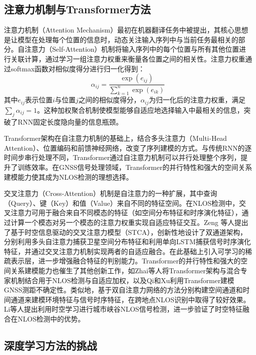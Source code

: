 \subsection{注意力机制与Transformer方法}

    注意力机制（Attention Mechanism）最初在机器翻译任务中被提出，其核心思想是让模型在处理每个位置的信息时，动态关注输入序列中与当前任务最相关的部分。自注意力（Self-Attention）机制将输入序列中的每个位置与所有其他位置进行关联计算，通过学习一组注意力权重来衡量各位置之间的相关性。注意力权重通过softmax函数对相似度得分进行归一化得到：
    \begin{equation}
    \alpha_{ij} = \frac{\exp(e_{ij})}{\sum_{k=1}^{n}\exp(e_{ik})}
    \end{equation}
    其中$e_{ij}$表示位置$i$与位置$j$之间的相似度得分，$\alpha_{ij}$为归一化后的注意力权重，满足$\sum_j \alpha_{ij} = 1$。这种加权聚合机制使模型能够自适应地选择输入中最相关的信息，突破了RNN固定长度隐向量的信息瓶颈。

    Transformer架构在自注意力机制的基础上，结合多头注意力（Multi-Head Attention）、位置编码和前馈神经网络，改变了序列建模的方式。与传统RNN的逐时间步串行处理不同，Transformer通过自注意力机制可以并行处理整个序列，提升了训练效率。在GNSS信号处理领域，Transformer的并行特性和强大的空间关系建模能力使其成为NLOS检测的理想选择。

    交叉注意力（Cross-Attention）机制是自注意力的一种扩展，其中查询（Query）、键（Key）和值（Value）来自不同的特征空间。在NLOS检测中，交叉注意力可用于融合来自不同模态的特征（如空间分布特征和时序演化特征），通过计算一个模态对另一个模态的注意力权重实现自适应特征交互。Zeng 等人\cite{zeng2024spatiotemporal}提出了基于时空信息驱动的交叉注意力模型（STCA），创新性地设计了双通道架构，分别利用多头自注意力捕获卫星空间分布特征和利用单向LSTM捕获信号时序演化特征，并通过交叉注意力机制实现两者的自适应融合。在此基础上引入可学习的稀疏表示层，进一步增强融合特征的判别能力。Transformer的并行特性和强大的空间关系建模能力也催生了其他创新工作，如Zhai等人\cite{zhai2025enhancing}将Transformer架构与混合专家机制结合用于NLOS检测与自适应加权，以及Qi和Xu\cite{applied_soft2025}利用Transformer建模GNSS测距不确定性。类似地，基于双自注意力网络的方法\cite{dual_self_attention2025}分别构建空间通道和时间通道来建模环境特征与信号时序特征，在跨地点NLOS识别中取得了较好效果。Li等人\cite{li2024gnss_positioning}提出利用时空学习进行城市峡谷NLOS信号检测，进一步验证了时空特征融合在NLOS检测中的优势。

\subsection{深度学习方法的挑战}

